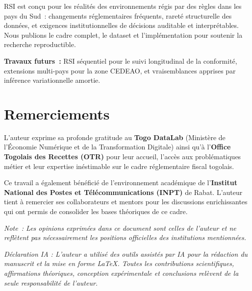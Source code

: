 \documentclass[letterpaper]{article}
\begin{document}
RSI est con\c{c}u pour les r\'ealit\'es des environnements r\'egis
par des r\`egles dans les pays du Sud~: changements r\'eglementaires
fr\'equents, raret\'e structurelle des donn\'ees, et exigences
institutionnelles de d\'ecisions auditable et interpr\'etables.
Nous publions le cadre complet, le dataset et l'impl\'ementation
pour soutenir la recherche reproductible.

\medskip
\noindent\textbf{Travaux futurs~:} RSI s\'equentiel pour le suivi
longitudinal de la conformit\'e, extensions multi-pays pour la zone
CEDEAO, et vraisemblances apprises par inf\'erence variationnelle amortie.

\section*{Remerciements}

L'auteur exprime sa profonde gratitude au \textbf{Togo DataLab}
(Minist\`ere de l'\'Economie Num\'erique et de la Transformation
Digitale) ainsi qu'\`a l'\textbf{Office Togolais des Recettes (OTR)}
pour leur accueil, l'acc\`es aux probl\'ematiques m\'etier et leur
expertise in\'estimable sur le cadre r\'eglementaire fiscal togolais.

Ce travail a \'egalement b\'en\'efici\'e de l'environnement acad\'emique
de l'\textbf{Institut National des Postes et T\'el\'ecommunications
(INPT)} de Rabat. L'auteur tient \`a remercier ses collaborateurs et
mentors pour les discussions enrichissantes qui ont permis de consolider
les bases th\'eoriques de ce cadre.

\textit{Note~: Les opinions exprim\'ees dans ce document sont celles
de l'auteur et ne refl\`etent pas n\'ecessairement les positions
officielles des institutions mentionn\'ees.}

\medskip
\noindent\textit{Déclaration IA : L'auteur a utilisé des outils 
assistés par IA pour la rédaction du manuscrit et la mise en forme 
\LaTeX{}. Toutes les contributions scientifiques, affirmations 
théoriques, conception expérimentale et conclusions relèvent de 
la seule responsabilité de l'auteur.}
\end{document}
